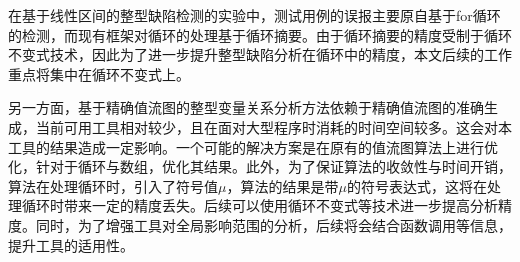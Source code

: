 在基于线性区间的整型缺陷检测的实验中，测试用例的误报主要原自基于for循环的检测，而现有框架对循环的处理基于循环摘要。由于循环摘要的精度受制于循环不变式技术，因此为了进一步提升整型缺陷分析在循环中的精度，本文后续的工作重点将集中在循环不变式上。

另一方面，基于精确值流图的整型变量关系分析方法依赖于精确值流图的准确生成，当前可用工具相对较少，且在面对大型程序时消耗的时间空间较多。这会对本工具的结果造成一定影响。一个可能的解决方案是在原有的值流图算法上进行优化，针对于循环与数组，优化其结果。此外，为了保证算法的收敛性与时间开销，算法在处理循环时，引入了符号值$ \mu $，算法的结果是带$ \mu $的符号表达式，这将在处理循环时带来一定的精度丢失。后续可以使用循环不变式等技术进一步提高分析精度。同时，为了增强工具对全局影响范围的分析，后续将会结合函数调用等信息，提升工具的适用性。





































